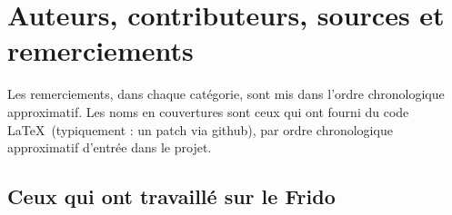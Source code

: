 \section{Auteurs, contributeurs, sources et remerciements}

Les remerciements, dans chaque catégorie, sont mis dans l'ordre chronologique approximatif. Les noms en couvertures sont ceux qui ont fourni du code \LaTeX\ (typiquement : un patch via github), par ordre chronologique approximatif d'entrée dans le projet.

\subsection{Ceux qui ont travaillé sur le Frido}

